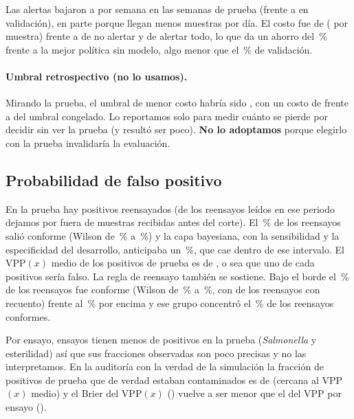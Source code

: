 Las alertas bajaron a \FinAlertasSemana{} por semana en las
\FinSemanasPrueba{} semanas de prueba (frente a \ClfAlertasSemana{} en
validación), en parte porque llegan menos muestras por día. El costo fue de
\FinCostoPrueba{} (\FinCostoPorMuestraPrueba{} por muestra) frente a
\FinCostoNoAlertar{} de no alertar y \FinCostoAlertarTodo{} de alertar todo,
lo que da un ahorro del \FinAhorroPct{}\,\% frente a la mejor política sin
modelo, algo menor que el \ClfAhorroPct{}\,\% de validación.

\paragraph{Umbral retrospectivo (no lo usamos).} Mirando la prueba, el umbral
de menor costo habría sido \FinUmbralRetro{}, con un costo de
\FinCostoRetro{} frente a \FinCostoPrueba{} del umbral congelado. Lo
reportamos solo para medir cuánto se pierde por decidir sin ver la prueba (y
resultó ser poco). \textbf{No lo adoptamos} porque elegirlo con la
prueba invalidaría la evaluación.

\subsection{Probabilidad de falso positivo}

En la prueba hay \FinPositivosReensayados{} positivos reensayados (de los
\FinReensayosLecturaPrueba{} reensayos leídos en ese periodo dejamos por fuera
\FinReensayosRecibidosAntes{} de muestras recibidas antes del corte). El \FinReensayoConformeObservadoPct{}\,\% de los reensayos
salió conforme (Wilson de \FinReensayoConformeObservadoInfPct{}\,\% a
\FinReensayoConformeObservadoSupPct{}\,\%) y la capa bayesiana, con la
sensibilidad y la especificidad del desarrollo, anticipaba un
\FinReensayoConformeEsperadoPct{}\,\%, que cae dentro de ese intervalo. El
VPP$(x)$ medio de los positivos de prueba es de \FinVPPxMedio{}, o sea que uno
de cada \FinUnoDeCadaFalso{} positivos sería falso. La regla de reensayo
también se sostiene. Bajo el borde el \FinReglaTasaBajoPct{}\,\% de los
reensayos fue conforme (Wilson de \FinReglaTasaBajoInfPct{}\,\% a
\FinReglaTasaBajoSupPct{}\,\%, con \FinReglaBajoBorde{} de los
\FinReglaReensayosConRecuento{} reensayos con recuento) frente al
\FinReglaTasaAltoPct{}\,\% por encima y ese grupo concentró el
\FinReglaCapturaPct{}\,\% de los reensayos conformes.

Por ensayo, \FinEnsayosPocosPositivos{} ensayos tienen menos de
\FinMinimoPositivos{} positivos en la prueba (\textit{Salmonella} y
esterilidad) así que sus fracciones observadas son poco precisas y no las
interpretamos. En la auditoría con la verdad de la simulación la fracción de
positivos de prueba que de verdad estaban contaminados es de
\FinAudVPPReal{} (cercana al VPP$(x)$ medio) y el Brier del VPP$(x)$
(\FinAudBrierVPPx{}) vuelve a ser menor que el del VPP por ensayo
(\FinAudBrierVPPEnsayo{}).

